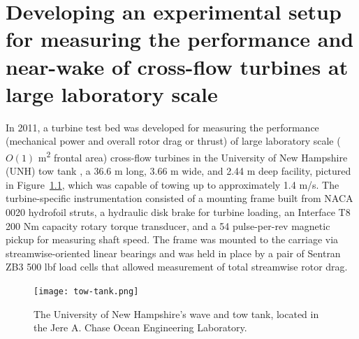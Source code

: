 \chapter{Developing an experimental setup for measuring the performance and
    near-wake of cross-flow turbines at large laboratory
    scale}\label{chap:exp-setup}

In 2011, a turbine test bed was developed for measuring the performance
(mechanical power and overall rotor drag or thrust) of large laboratory scale
($O(1)$ m\textsuperscript{2} frontal area) cross-flow turbines in the University
of New Hampshire (UNH) tow tank \cite{Bachant2011-MS}, a 36.6 m long, 3.66 m
wide, and 2.44 m deep facility, pictured in Figure~\ref{fig:tow-tank}, which was
capable of towing up to approximately 1.4 m/s. The turbine-specific
instrumentation consisted of a mounting frame built from NACA 0020 hydrofoil
struts, a hydraulic disk brake for turbine loading, an Interface T8 200 Nm
capacity rotary torque transducer, and a 54 pulse-per-rev magnetic pickup for
measuring shaft speed. The frame was mounted to the carriage via
streamwise-oriented linear bearings and was held in place by a pair of Sentran
ZB3 500 lbf load cells that allowed measurement of total streamwise rotor drag.

\begin{figure}
    \centering
    
    \texttt{[image: tow-tank.png]}
    
    \caption{The University of New Hampshire's wave and tow tank, located in the
        Jere A. Chase Ocean Engineering Laboratory.}
    
    \label{fig:tow-tank}
\end{figure}

